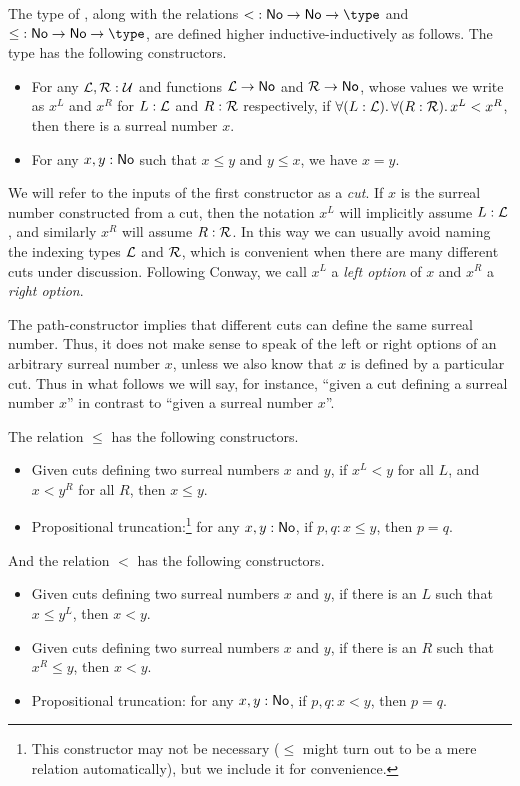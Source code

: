 \begin{defn}\label{defn:surreals}
  The type \NO of , along with the relations $\mathord<:\NO\to\NO\to\type$ and $\mathord\le:\NO\to\NO\to\type$, are defined higher inductive-inductively as follows.
  The type \NO has the following constructors.
  \begin{itemize}
  \item For any $\mathcal{L},\mathcal{R}:\mathcal{U}$ and functions $\mathcal{L}\to \mathsf{No}$ and $\mathcal{R}\to \mathsf{No}$, whose values we write as $x^L$ and $x^R$ for $L:\mathcal{L}$ and $R:\mathcal{R}$ respectively, if $\fall{L:\LL}{R:\RR} x^L<x^R$, then there is a surreal number $x$.
  \item For any $x,y:\mathsf{No}$ such that $x\le y$ and $y\le x$, we have $x=y$.
  \end{itemize}
  We will refer to the inputs of the first constructor as a \emph{cut}.
  If $x$ is the surreal number constructed from a cut, then the notation $x^L$ will implicitly assume $L:\mathcal{L}$, and similarly $x^R$ will assume $R:\mathcal{R}$.
  In this way we can usually avoid naming the indexing types $\mathcal{L}$ and $\mathcal{R}$, which is convenient when there are many different cuts under discussion.
  Following Conway, we call $x^L$ a \emph{left option} of $x$ and $x^R$ a \emph{right option}.

  The path-constructor implies that different cuts can define the same surreal number.
  Thus, it does not make sense to speak of the left or right options of an arbitrary surreal number $x$, unless we also know that $x$ is defined by a particular cut.
  Thus in what follows we will say, for instance, ``given a cut defining a surreal number $x$'' in contrast to ``given a surreal number $x$''.

  The relation $\le$ has the following constructors.
  \begin{itemize}
  \item Given cuts defining two surreal numbers $x$ and $y$, if $x^L<y$ for all $L$, and $x<y^R$ for all $R$, then $x\le y$.
  \item Propositional truncation:\footnote{This constructor may not be necessary ($\le$ might turn out to be a mere relation automatically), but we include it for convenience.}
    for any $x,y:\mathsf{No}$, if $p,q:x\le y$, then $p=q$.
  \end{itemize}
  And the relation $<$ has the following constructors.
  \begin{itemize}
  \item Given cuts defining two surreal numbers $x$ and $y$, if there is an $L$ such that $x\le y^L$, then $x<y$.
  \item Given cuts defining two surreal numbers $x$ and $y$, if there is an $R$ such that $x^R\le y$, then $x<y$.
  \item Propositional truncation: for any $x,y:\mathsf{No}$, if $p,q:x<y$, then $p=q$.
  \end{itemize}
\end{defn}

